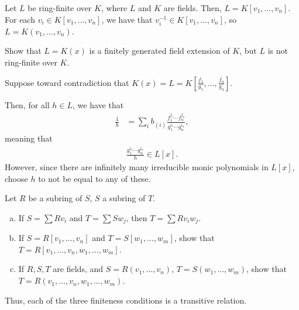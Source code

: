 \documentclass[10pt]{mypackage}
\begin{document}
\begin{solution}
  Let $L$ be ring-finite over $K$, where $L$ and $K$ are fields. Then, $L = K\left[ v_1,\dots,v_n \right]$. For each $v_i\in K\left[ v_1,\dots,v_n \right]$, we have that $v_i^{-1}\in K\left[ v_1,\dots,v_n \right]$, so $L = K\left( v_1,\dots,v_n \right)$.
\end{solution}
\begin{exercise}[Exercise 1.44]
  Show that $L = K(x)$ is a finitely generated field extension of $K$, but $L$ is not ring-finite over $K$.
\end{exercise}
\begin{solution}
  Suppose toward contradiction that $K\left( x \right) = L = K\left[ \frac{f_1}{g_1},\dots,\frac{f_n}{g_n} \right]$.\newline

  Then, for all $h\in L$, we have that 
  \begin{align*}
    \frac{1}{h} &= \sum_{i}b_{(i)}\frac{f_1^{j_1}\cdots f_n^{j_n}}{g_1^{i_1}\cdots g_n^{i_n}},
  \end{align*}
  meaning that
  \begin{align*}
    \frac{g_1^{i_1}\cdots g_n^{i_n}}{h}\in L\left[ x \right].
  \end{align*}
  However, since there are infinitely many irreducible monic polynomials in $L\left[ x \right]$, choose $h$ to not be equal to any of these.
\end{solution}

\begin{exercise}[Exercise 1.45]
  Let $R$ be a subring of $S$, $S$ a subring of $T$.
  \begin{enumerate}[(a)]
    \item If $S = \sum Rv_i$ and $T = \sum Sw_j$, then $T = \sum Rv_iw_j$.
    \item If $S = R\left[ v_1,\dots,v_n \right]$ and $T = S\left[ w_1,\dots,w_m \right]$, show that $T = R\left[ v_1,\dots,v_n,w_1,\dots,w_m \right]$.
    \item If $R,S,T$ are fields, and $S = R\left( v_1,\dots,v_n \right)$, $T = S\left( w_1,\dots,w_m \right)$, show that $T = R\left( v_1,\dots,v_n,w_1,\dots,w_m \right)$.
  \end{enumerate}
  Thus, each of the three finiteness conditions is a transitive relation.
\end{exercise}
\end{document}
